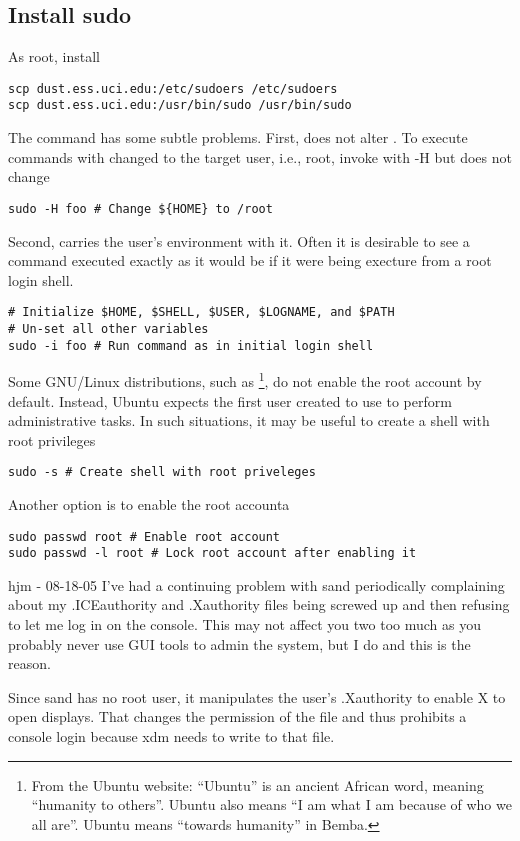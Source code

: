\documentclass[12pt,twoside]{article}
\begin{document}
\subsection{Install sudo}\label{sxn:sudo}
As root, install  
\begin{verbatim}
scp dust.ess.uci.edu:/etc/sudoers /etc/sudoers
scp dust.ess.uci.edu:/usr/bin/sudo /usr/bin/sudo
\end{verbatim}
The  command has some subtle problems.
First,  does not alter .
To execute commands with  changed to the target user,
i.e., root, invoke  with -H
 but does not change 
\begin{verbatim}
sudo -H foo # Change ${HOME} to /root
\end{verbatim}
Second,  carries the user's environment with it.
Often it is desirable to see a command executed exactly as it would be
if it were being execture from a root login shell.
\begin{verbatim}
# Initialize $HOME, $SHELL, $USER, $LOGNAME, and $PATH
# Un-set all other variables
sudo -i foo # Run command as in initial login shell
\end{verbatim}
Some GNU/Linux distributions, such as 
\footnote{From the Ubuntu website:
``Ubuntu'' is an ancient African word, meaning ``humanity to others''.  
Ubuntu also means ``I am what I am because of who we all are''.
Ubuntu means ``towards humanity'' in Bemba.}, 
do not enable the root account by default.
Instead, Ubuntu expects the first user created to use 
to perform administrative tasks.
In such situations, it may be useful to create a shell with root
privileges
\begin{verbatim}
sudo -s # Create shell with root priveleges
\end{verbatim}
Another option is to enable the root accounta
\begin{verbatim}
sudo passwd root # Enable root account 
sudo passwd -l root # Lock root account after enabling it
\end{verbatim}

hjm - 08-18-05
I've had a continuing problem with sand periodically complaining about my .ICEauthority and .Xauthority files being screwed up and then refusing to let me log in on the console.  This may not affect you two too much as you probably never use GUI tools to admin the system, but I do and this is the reason.

Since sand has no root user, it manipulates the user's .Xauthority to enable X to open displays.  That changes the permission of the file and thus prohibits a console login because xdm needs to write to that file.
\end{document}

